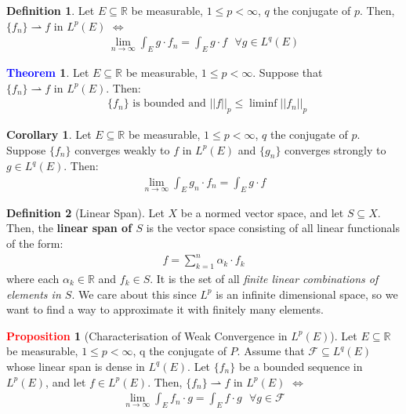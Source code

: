 \documentclass[11pt]{article}
\theoremstyle{definition}
\theoremstyle{definition}
\newcommand{\R}[0]{\mathbb{R}}
\newcommand{\EinR}[0]{Let $E \subseteq \R$ be measurable}
\newcommand{\idx}[2]{\int_{#1}^{#2}}
\newcommand{\warrow}[0]{\rightharpoonup}
\newcommand{\fcvw}[0]{ \{f_n \} \warrow f \text{ in } L^p(E)}
\newtheorem{theorem}{\textcolor{blue}{Theorem}}
\newtheorem{corollary}{Corollary}
\theoremstyle{definition}
\newtheorem{definition}{\textcolor{OliveGreen}{Definition}}
\newtheorem{prop}{\textcolor{red}{Proposition}}
\theoremstyle{remark}
\begin{document}
\begin{definition}
	\EinR, $1 \leq p < \infty$, $q$ the conjugate of $p$. Then, $\fcvw$ $\iff$ 
	\begin{align}
		\lim_{n \rightarrow \infty} \idx{E}{} g \cdot f_n = \idx{E}{} g \cdot f \text{ 		} \forall g \in L^q(E) 
	\end{align}
\end{definition}

\begin{theorem}
	\EinR, $1 \leq p < \infty$. Suppose that $\fcvw$. Then: 
	\begin{align*}
		\text{ $\{f_n\}$ is bounded and } ||f||_p \leq \liminf ||f_n||_p 	
	\end{align*}
\end{theorem}

\begin{corollary}
	\EinR, $1 \leq p < \infty$, $q$ the conjugate of $p$. Suppose $\{f_n\}$ converges weakly to $f$ in $L^p(E)$ and $\{ g_n \}$ converges strongly to $g \in L^q(E)$. Then: 
	\begin{align}
		\lim_{n \rightarrow \infty} \idx{E}{} g_n \cdot f_n = \idx{E}{} g \cdot f
	\end{align}
\end{corollary}

\begin{definition}[Linear Span] 
	Let $X$ be a normed vector space, and let $S \subseteq X$. Then, the \textbf{linear span of $S$} is the vector space consisting of all linear functionals of the form: 
	\begin{align}
		f = \sum_{k=1}^n \alpha_k \cdot f_k 
	\end{align}
	where each $\alpha_k \in \R$ and $f_k \in S$. It is the set of all \emph{finite linear combinations of elements in $S$}. We care about this since $L^p$ is an infinite dimensional  space, so we want to find a way to approximate it with finitely many elements. 
\end{definition}

\begin{prop}[Characterisation of Weak Convergence in $L^p(E)$] 
	\EinR, $1 \leq p < \infty$, q the conjugate of $P$. Assume that $\mathcal{F} \subseteq L^q(E)$ whose linear span is dense in $L^q(E)$. Let $\{f_n \}$ be a bounded sequence in $L^p(E)$, and let $f \in L^p(E)$. Then, $\fcvw$ $\iff$ 
	\begin{align}
		\lim_{n \rightarrow \infty} \idx{E}{} f_n \cdot g = \idx{E}{} f \cdot g \text{ 		} \forall g \in \mathcal{F} 
	\end{align}
\end{prop}
\end{document}
